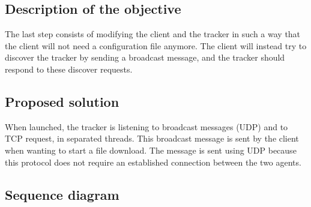 \subsection{Description of the objective}

The last step consists of modifying the client and the tracker in such a way that the client will not need a configuration file anymore. The client will instead try to discover the tracker by sending a broadcast message, and the tracker should respond to these discover requests.

\subsection{Proposed solution}

When launched, the tracker is listening to broadcast messages (UDP) and to TCP request, in separated threads. This broadcast message is sent by the client when wanting to start a file download. The message is sent using UDP because this protocol does not require an established connection between the two agents.

\subsection{Sequence diagram}

